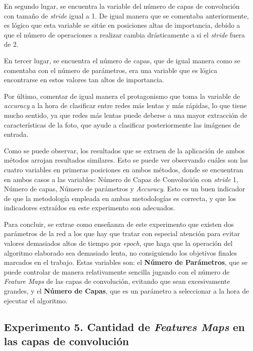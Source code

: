 \begin{itemize}
    En segundo lugar, se encuentra la variable del número de capas de convolución con tamaño de \textit{stride} igual a 1. De igual manera que se comentaba anteriormente, es lógico que esta variable se sitúe en posiciones altas de importancia, debido a que el número de operaciones a realizar cambia drásticamente a si el \textit{stride} fuera de 2.
    
    En tercer lugar, se encuentra el número de capas, que de igual manera como se comentaba con el número de parámetros, era una variable que es lógica encontrarse en estos valores tan altos de importancia.
    
    Por último, comentar de igual manera el protagonismo que toma la variable de \textit{accuracy} a la hora de clasificar entre redes más lentas y más rápidas, lo que tiene mucho sentido, ya que redes más lentas puede deberse a una mayor extracción de características de la foto, que ayude a clasificar posteriormente las imágenes de entrada.
     
\end{itemize}

Como se puede observar, los resultados que se extraen de la aplicación de ambos métodos arrojan resultados similares. Esto se puede ver observando cuáles son las cuatro variables en primeras posiciones en ambos métodos, donde se encuentran en ambos casos a las variables: Número de Capas de Convolución con \textit{stride} 1, Número de capas, Número de parámetros y \textit{Accuracy}. Esto es un buen indicador de que la metodología empleada en ambas metodologías es correcta, y que los indicadores extraídos en este experimento son adecuados.

Para concluir, se extrae como enseñanza de este experimento que existen dos parámetros de la red a los que hay que tratar con especial atención para evitar valores demasiados altos de tiempo por \textit{epoch}, que haga que la operación del algoritmo elaborado sea demasiado lenta, no consiguiendo los objetivos finales marcados en el trabajo. Estas variables son: el \textbf{Número de Parámetros}, que se puede controlar de manera relativamente sencilla jugando con el número de \textit{Feature Maps} de las capas de convolución, evitando que sean excesivamente grandes, y el \textbf{Número de Capas}, que es un parámetro a seleccionar a la hora de ejecutar el algoritmo.


\subsection{Experimento 5. Cantidad de \textit{Features Maps} en las capas de convolución}


